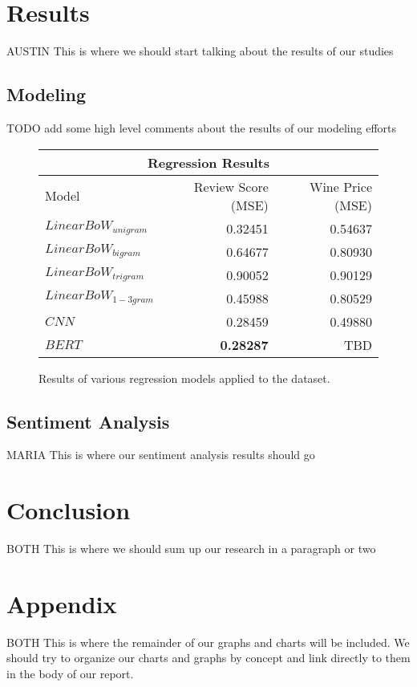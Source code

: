 \documentclass[11pt,english]{article}
\begin{document}
\section{Results}
    AUSTIN
    This is where we should start talking about the results of our studies

\subsection{Modeling}
    TODO add some high level comments about the results of our modeling efforts

    \begin{figure}
    \centering
    \begin{tabular}{ |l||r|r|  }
        \hline
        \multicolumn{3}{|c|}{Regression Results} \\
        \hline
        Model& Review Score (MSE) & Wine Price (MSE) \\
        \hline
        $Linear BoW_{unigram}$   & 0.32451          & 0.54637 \\
        $Linear BoW_{bigram}$    & 0.64677          & 0.80930 \\
        $Linear BoW_{trigram}$   & 0.90052          & 0.90129 \\
        $Linear BoW_{1-3gram}$   & 0.45988          & 0.80529 \\
        \hline
        $CNN$                    & 0.28459          & 0.49880 \\
        \hline
        $BERT$                   & \textbf{0.28287} & TBD \\
        \hline
    \end{tabular}
    \caption{ Results of various regression models applied to the dataset. }
    \end{figure}

\subsection{Sentiment Analysis}
    MARIA
    This is where our sentiment analysis results should go

\section{Conclusion}
    BOTH
    This is where we should sum up our research in a paragraph or two

\newpage
\section{Appendix}
    BOTH
    This is where the remainder of our graphs and charts will be included. We should try to organize our charts and graphs by concept and link directly to them in the body of our report.
\end{document}
